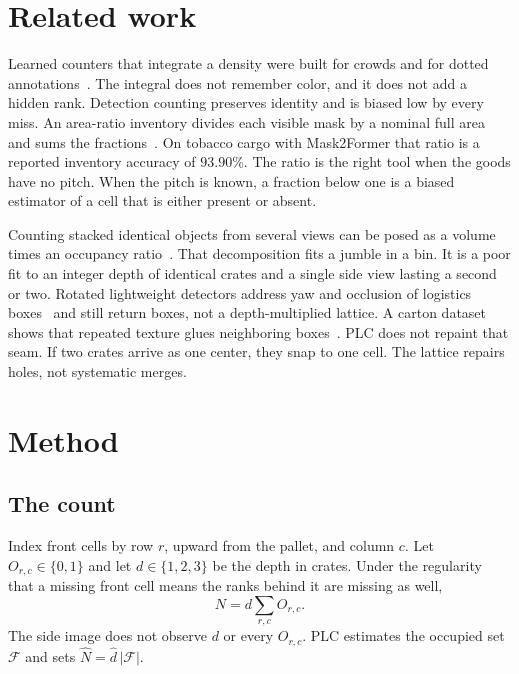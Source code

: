 \documentclass[10pt]{article}
\begin{document}
\section{Related work}
Learned counters that integrate a density were built for crowds and for dotted annotations~\cite{lempitsky2010,li2018}. The integral does not remember color, and it does not add a hidden rank. Detection counting preserves identity and is biased low by every miss. An area-ratio inventory divides each visible mask by a nominal full area and sums the fractions~\cite{hu2025}. On tobacco cargo with Mask2Former that ratio is a reported inventory accuracy of $93.90\%$. The ratio is the right tool when the goods have no pitch. When the pitch is known, a fraction below one is a biased estimator of a cell that is either present or absent.

Counting stacked identical objects from several views can be posed as a volume times an occupancy ratio~\cite{dumery2024}. That decomposition fits a jumble in a bin. It is a poor fit to an integer depth of identical crates and a single side view lasting a second or two. Rotated lightweight detectors address yaw and occlusion of logistics boxes~\cite{wang2025} and still return boxes, not a depth-multiplied lattice. A carton dataset shows that repeated texture glues neighboring boxes~\cite{yang2022}. PLC does not repaint that seam. If two crates arrive as one center, they snap to one cell. The lattice repairs holes, not systematic merges.

\section{Method}
\subsection{The count}
Index front cells by row $r$, upward from the pallet, and column $c$. Let $O_{r,c}\in\{0,1\}$ and let $d\in\{1,2,3\}$ be the depth in crates. Under the regularity that a missing front cell means the ranks behind it are missing as well,
\begin{equation}
N=d\sum_{r,c}O_{r,c}.
\label{eq:truth}
\end{equation}
The side image does not observe $d$ or every $O_{r,c}$. PLC estimates the occupied set $\mathcal{F}$ and sets $\hat N=\hat d\,|\mathcal{F}|$.
\end{document}
